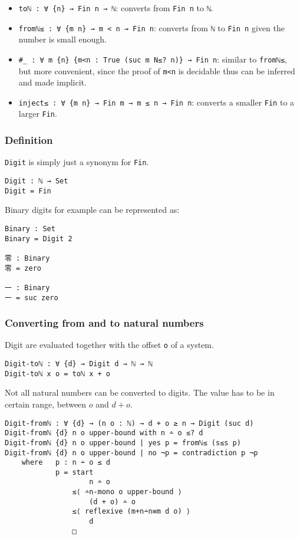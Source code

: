 \documentclass[12pt, a4paper]{article}
\begin{document}
\begin{itemize}
    \item {\lstinline|toℕ : ∀ {n} → Fin n → ℕ|}: converts from {\lstinline|Fin n|} to {\lstinline|ℕ|}.
    \item {\lstinline|fromℕ≤ : ∀ {m n} → m < n → Fin n|}: converts from {\lstinline|ℕ|} to {\lstinline|Fin n|} given the number is small enough.
    \item {\lstinline|#_ : ∀ m {n} {m<n : True (suc m N≤? n)} → Fin n|}: similar to {\lstinline|fromℕ≤|}, but more convenient, since
        the proof of {\lstinline|m<n|} is decidable thus can be inferred and made implicit.
    \item {\lstinline|inject≤ : ∀ {m n} → Fin m → m ≤ n → Fin n|}: converts a smaller {\lstinline|Fin|} to a larger {\lstinline|Fin|}.
\end{itemize}

\subsubsection{Definition}

{\lstinline|Digit|} is simply just a synonym for {\lstinline|Fin|}.

\begin{lstlisting}
Digit : ℕ → Set
Digit = Fin
\end{lstlisting}

Binary digits for example can be represented as:

\begin{lstlisting}
Binary : Set
Binary = Digit 2

零 : Binary
零 = zero

一 : Binary
一 = suc zero
\end{lstlisting}

\subsubsection{Converting from and to natural numbers}

Digit are evaluated together with the offset {\lstinline|o|} of a system.

\begin{lstlisting}
Digit-toℕ : ∀ {d} → Digit d → ℕ → ℕ
Digit-toℕ x o = toℕ x + o
\end{lstlisting}

Not all natural numbers can be converted to digits. The value has to be in certain
range, between $ o $ and $ d + o $.

\begin{lstlisting}
Digit-fromℕ : ∀ {d} → (n o : ℕ) → d + o ≥ n → Digit (suc d)
Digit-fromℕ {d} n o upper-bound with n ∸ o ≤? d
Digit-fromℕ {d} n o upper-bound | yes p = fromℕ≤ (s≤s p)
Digit-fromℕ {d} n o upper-bound | no ¬p = contradiction p ¬p
    where   p : n ∸ o ≤ d
            p = start
                    n ∸ o
                ≤⟨ ∸n-mono o upper-bound ⟩
                    (d + o) ∸ o
                ≤⟨ reflexive (m+n∸n≡m d o) ⟩
                    d
                □
\end{lstlisting}
\end{document}
